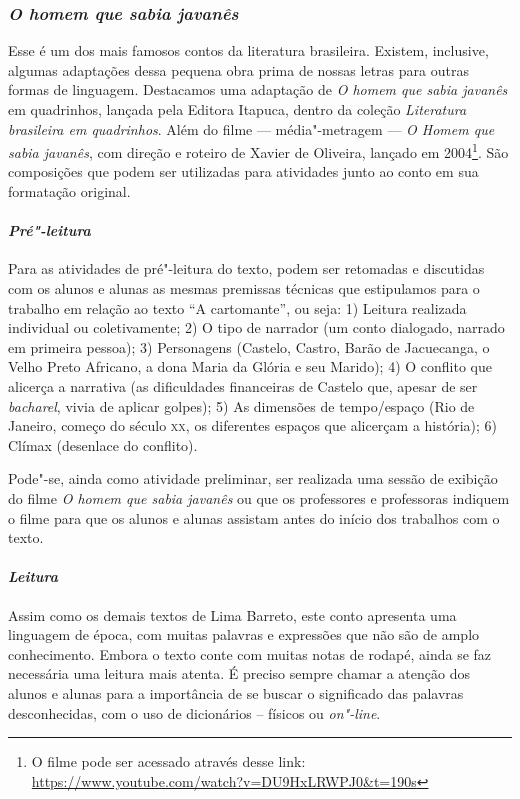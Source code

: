 \documentclass[11pt]{extarticle}
\begin{document}
\subsubsection{\textit{O homem que sabia javanês}}

Esse é um dos mais famosos contos da literatura brasileira. Existem,
inclusive, algumas adaptações dessa pequena obra prima de nossas letras
para outras formas de linguagem. Destacamos uma adaptação de
\textit{O homem que sabia javanês} em quadrinhos, lançada pela
Editora Itapuca, dentro da coleção \emph{Literatura brasileira em
quadrinhos}. Além do filme --- média"-metragem --- \emph{O Homem que sabia
javanês}, com direção e roteiro de Xavier de Oliveira, lançado em
2004\footnote{O filme pode ser acessado através desse link:
  \url{https://www.youtube.com/watch?v=DU9HxLRWPJ0\&t=190s}}. São
composições que podem ser utilizadas para atividades junto ao conto em
sua formatação original.

\paragraph{\textit{Pré"-leitura}}

Para as atividades de pré"-leitura do texto, podem ser retomadas e
discutidas com os alunos e alunas as mesmas premissas técnicas que
estipulamos para o trabalho em relação ao texto ``A
cartomante'', ou seja: 1) Leitura realizada individual ou coletivamente;
2) O tipo de narrador (um conto dialogado, narrado em primeira pessoa);
3) Personagens (Castelo, Castro, Barão de Jacuecanga, o Velho Preto
Africano, a dona Maria da Glória e seu Marido); 4) O conflito que
alicerça a narrativa (as dificuldades financeiras de Castelo que, apesar
de ser \emph{bacharel}, vivia de aplicar golpes); 5) As dimensões de
tempo/espaço (Rio de Janeiro, começo do século \textsc{xx}, os diferentes espaços
que alicerçam a história); 6) Clímax (desenlace do conflito).

Pode"-se, ainda como atividade preliminar, ser realizada uma sessão de
exibição do filme \emph{O homem que sabia javanês} ou que os professores e
professoras indiquem o filme para que os alunos e alunas assistam antes
do início dos trabalhos com o texto.

\paragraph{\textit{Leitura}}

Assim como os demais textos de Lima Barreto, este conto apresenta uma
linguagem de época, com muitas palavras e expressões que não são de
amplo conhecimento. Embora o texto conte com muitas notas de rodapé,
ainda se faz necessária uma leitura mais atenta. É preciso sempre chamar
a atenção dos alunos e alunas para a importância de se buscar o
significado das palavras desconhecidas, com o uso de dicionários --
físicos ou ­\emph{on"-line}.
\end{document}
